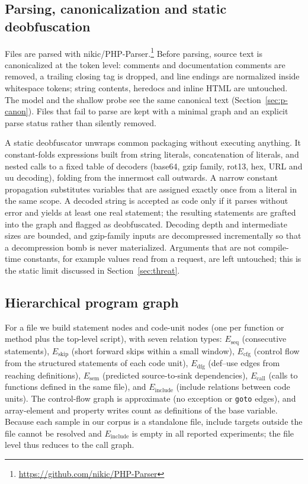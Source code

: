 \documentclass[pdflatex,sn-mathphys-num]{sn-jnl}
\begin{document}
\subsection{Parsing, canonicalization and static deobfuscation}\label{sec:parse}
Files are parsed with nikic/PHP-Parser.\footnote{\url{https://github.com/nikic/PHP-Parser}}
Before parsing, source text is canonicalized at the token level: comments and
documentation comments are removed, a trailing closing tag is dropped, and
line endings are normalized inside whitespace tokens; string contents,
heredocs and inline HTML are untouched. The model and the shallow probe see
the same canonical text (Section~\ref{sec:p-canon}). Files that fail to parse
are kept with a minimal graph and an explicit parse status rather than
silently removed.

A static deobfuscator unwraps common packaging without executing anything. It
constant-folds expressions built from string literals, concatenation of
literals, and nested calls to a fixed table of decoders (base64, gzip family,
rot13, hex, URL and uu decoding), folding from the innermost call outwards. A
narrow constant propagation substitutes variables that are assigned exactly
once from a literal in the same scope. A decoded string is accepted as code
only if it parses without error and yields at least one real statement; the
resulting statements are grafted into the graph and flagged as deobfuscated.
Decoding depth and intermediate sizes are bounded, and gzip-family inputs are
decompressed incrementally so that a decompression bomb is never materialized.
Arguments that are not compile-time constants, for example values read from a
request, are left untouched; this is the static limit discussed in
Section~\ref{sec:threat}.

\subsection{Hierarchical program graph}\label{sec:graph}
For a file we build statement nodes and code-unit nodes (one per function or
method plus the top-level script), with seven relation types:
$E_{\text{seq}}$ (consecutive statements), $E_{\text{skip}}$ (short forward
skips within a small window), $E_{\text{cfg}}$ (control flow from the
structured statements of each code unit), $E_{\text{dfg}}$ (def--use edges from
reaching definitions), $E_{\text{sem}}$ (predicted source-to-sink
dependencies), $E_{\text{call}}$ (calls to functions defined in the same file),
and $E_{\text{include}}$ (include relations between code units). The
control-flow graph is approximate (no exception or \texttt{goto} edges), and
array-element and property writes count as definitions of the base variable.
Because each sample in our corpus is a standalone file, include targets outside
the file cannot be resolved and $E_{\text{include}}$ is empty in all reported
experiments; the file level thus reduces to the call graph.
\end{document}

